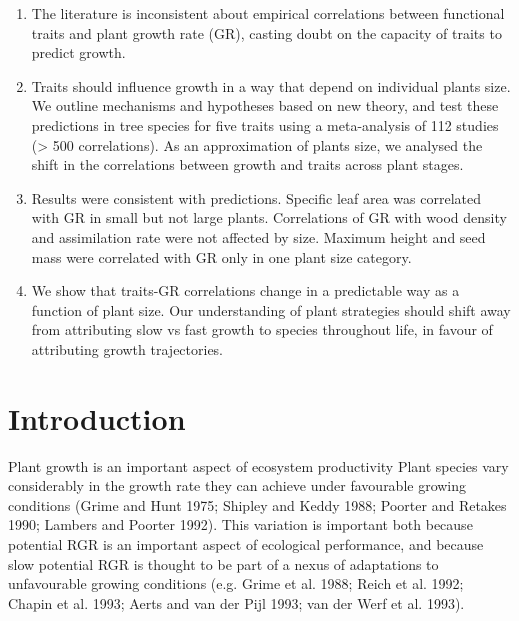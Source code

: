 \documentclass[a4paper]{article}\usepackage[]{graphicx}\usepackage[]{color}
\begin{document}
\begin{enumerate}

\item
The literature is inconsistent about empirical correlations between functional traits and plant growth rate (GR), casting doubt on the capacity of traits to predict growth.

\item 
Traits should influence growth in a way that depend on individual plants size. We outline mechanisms and hypotheses based on new theory, and test these predictions in tree species for five traits using a meta-analysis of 112 studies (> 500 correlations). As an approximation of plants size, we analysed the shift in the correlations between growth and traits across plant stages.

\item
Results were consistent with predictions. Specific leaf area was correlated with GR in small but not large plants. Correlations of GR with wood density and assimilation rate were not affected by size. Maximum height and seed mass were correlated with GR only in one plant size category.

\item 
We show that traits-GR correlations change in a predictable way as a function of plant size. Our understanding of plant strategies should shift away from attributing slow vs fast growth to species throughout life, in favour of attributing growth trajectories.

 
\end{enumerate}


\section*{Introduction}\label{introduction}
Plant growth is an important aspect of ecosystem productivity
Plant species vary considerably in the growth rate they can achieve under favourable growing conditions (Grime and Hunt 1975; Shipley and Keddy 1988; Poorter and Retakes 1990; Lambers and Poorter 1992). This variation is important both because potential RGR is an important aspect of ecological performance, and because slow potential RGR is thought to be part of a nexus of adaptations to unfavourable growing conditions (e.g. Grime et al. 1988; Reich et al. 1992; Chapin et al. 1993; Aerts and van der Pijl 1993; van der Werf et al. 1993). 
\end{document}
